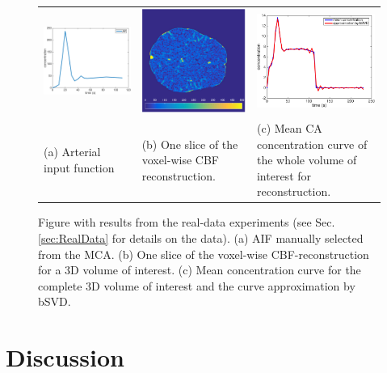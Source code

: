 \documentclass[journal,twocolumn]{IEEEtran}
\begin{document}
	\begin{figure}[h!tb]\label{fig:RealData}
		\begin{tabular}{p{} p{} p{} }
		 \includegraphics[width = .3\textwidth]{./figs/real_AIF.pdf} & \includegraphics[width = .3\textwidth]{./figs/real_axial160.pdf} & \includegraphics[width = .3\textwidth]{./figs/real_meanC.pdf} \\
		 (a) Arterial input function & (b) One slice of the voxel-wise CBF reconstruction.  & (c) Mean CA concentration curve of the whole volume of interest for reconstruction.
		\end{tabular}
		\caption{Figure with results from the real-data experiments (see Sec. \ref{sec:RealData} for details on the data). (a) AIF manually selected from the MCA. (b) One slice of the voxel-wise CBF-reconstruction for a 3D volume of interest. (c) Mean concentration curve for the complete 3D volume of interest and the curve approximation by bSVD.}
	\end{figure}
	

	
	
	\section{Discussion}\label{sec:conclusion}
	
\end{document}
